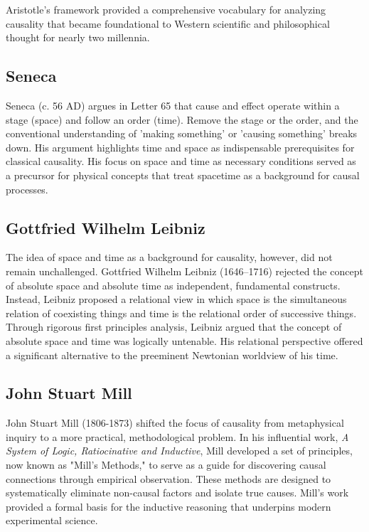 Aristotle’s framework provided a comprehensive vocabulary for analyzing causality that became foundational to Western scientific and philosophical thought for nearly two millennia.

\subsection{Seneca}
\label{sec:history_seneca}

Seneca (c. 56 AD) argues in Letter 65\cite{SenecaLetters} that cause and effect operate within a stage (space) and follow an order (time). Remove the stage or the order, and the conventional understanding of 'making something' or 'causing something' breaks down. His argument highlights time and space as indispensable prerequisites for classical causality. His focus on space and time as necessary conditions served as a precursor for physical concepts that treat spacetime as a background for causal processes.

\subsection{Gottfried Wilhelm Leibniz}
\label{sec:history_leibniz}

The idea of space and time as a background for causality, however, did not remain unchallenged. Gottfried Wilhelm Leibniz (1646--1716) rejected the concept of absolute space and absolute time as independent, fundamental constructs. Instead, Leibniz proposed\cite{LeibnizPhysicsSEP} a relational view in which space is the simultaneous relation of coexisting things and time is the relational order of successive things.
Through rigorous first principles analysis, Leibniz argued that the concept of absolute space and time was logically untenable.
His relational perspective offered a significant alternative to the preeminent Newtonian worldview of his time.

\subsection{John Stuart Mill}
\label{sec:history_stuart_mill}

John Stuart Mill (1806-1873) shifted the focus of causality from metaphysical inquiry to a more practical, methodological problem. In his influential work, \textit{A System of Logic, Ratiocinative and Inductive}\cite{mill2023system}, Mill developed a set of principles, now known as "Mill's Methods," to serve as a guide for discovering causal connections through empirical observation. These methods are designed to systematically eliminate non-causal factors and isolate true causes. Mill's work provided a formal basis for the inductive reasoning that underpins modern experimental science.

